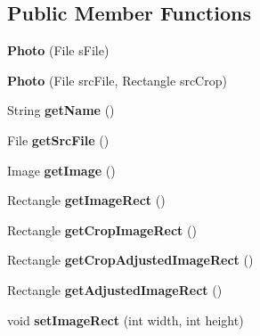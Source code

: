 \subsection*{Public Member Functions}
\begin{DoxyCompactItemize}
\item 
\hypertarget{class_photo_a34fb5fcdc854bddfe5bcaf52fc4bedc9}{{\bfseries Photo} (File s\-File)}\label{class_photo_a34fb5fcdc854bddfe5bcaf52fc4bedc9}

\item 
\hypertarget{class_photo_a9fc3e7f49ec338b2097baf8c02277e3a}{{\bfseries Photo} (File src\-File, Rectangle src\-Crop)}\label{class_photo_a9fc3e7f49ec338b2097baf8c02277e3a}

\item 
\hypertarget{class_photo_a2ead9b28a76e7969b940fd0bc0df2eb7}{String {\bfseries get\-Name} ()}\label{class_photo_a2ead9b28a76e7969b940fd0bc0df2eb7}

\item 
\hypertarget{class_photo_a27d5af5113f75e353b09c55242db79a7}{File {\bfseries get\-Src\-File} ()}\label{class_photo_a27d5af5113f75e353b09c55242db79a7}

\item 
\hypertarget{class_photo_aa0fe056b7b47f7d185dfe1ef33605933}{Image {\bfseries get\-Image} ()}\label{class_photo_aa0fe056b7b47f7d185dfe1ef33605933}

\item 
\hypertarget{class_photo_af19f3636644e6e4096abe161373ed86b}{Rectangle {\bfseries get\-Image\-Rect} ()}\label{class_photo_af19f3636644e6e4096abe161373ed86b}

\item 
\hypertarget{class_photo_afca1360208ac74f21156c30540358b07}{Rectangle {\bfseries get\-Crop\-Image\-Rect} ()}\label{class_photo_afca1360208ac74f21156c30540358b07}

\item 
\hypertarget{class_photo_a06bdd8ad343d72ed52b0788c0c14f5d4}{Rectangle {\bfseries get\-Crop\-Adjusted\-Image\-Rect} ()}\label{class_photo_a06bdd8ad343d72ed52b0788c0c14f5d4}

\item 
\hypertarget{class_photo_ad7f11dfd91805884d3210ae5a0a3d89c}{Rectangle {\bfseries get\-Adjusted\-Image\-Rect} ()}\label{class_photo_ad7f11dfd91805884d3210ae5a0a3d89c}

\item 
\hypertarget{class_photo_a779642ff1fa78ae161fd938a45d4ef77}{void {\bfseries set\-Image\-Rect} (int width, int height)}\label{class_photo_a779642ff1fa78ae161fd938a45d4ef77}


\end{DoxyCompactItemize}

